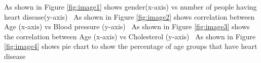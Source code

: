 As shown in Figure \ref{fig:image1} shows gender(x-axis) vs number of people having heart disease(y-axis) 
As shown in Figure \ref{fig:image2} shows correlation between Age (x-axis) vs Blood pressure (y-axis) 
As shown in Figure \ref{fig:image3} shows the correlation between Age (x-axis) vs Cholesterol (y-axis) 
As shown in Figure \ref{fig:image4} shows pie chart to show the percentage of age groups that have heart disease 
